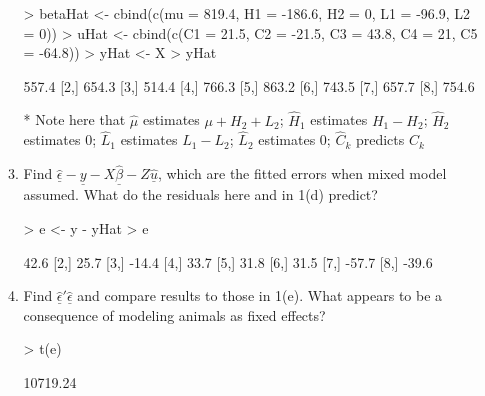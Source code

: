 \documentclass[12pt,a4paper]{paper}
\begin{document}
\begin{enumerate}
\begin{enumerate}
\begin{Schunk}
\begin{Sinput}
> betaHat <- cbind(c(mu = 819.4, H1 = -186.6, H2 = 0, L1 = -96.9, L2 = 0))
> uHat <- cbind(c(C1 = 21.5, C2 = -21.5, C3 = 43.8, C4 = 21,  C5 = -64.8))
> yHat <- X %*% betaHat + Z %*% uHat
> yHat
\end{Sinput}
\begin{Soutput}
      [,1]
[1,] 557.4
[2,] 654.3
[3,] 514.4
[4,] 766.3
[5,] 863.2
[6,] 743.5
[7,] 657.7
[8,] 754.6
\end{Soutput}
\end{Schunk}
\item[*] Note here that $\hat{\mu}$ estimates $\mu + H_{2} + L_{2}$; $\hat{H}_{1}$ estimates $H_{1} - H_{2}$; $\hat{H}_{2}$ estimates $0$; $\hat{L}_{1}$ estimates $L_{1} - L_{2}$; $\hat{L}_{2}$ estimates $0$; $\hat{C}_{k}$ predicts $C_{k}$
\item Find $\underline{\hat{\epsilon}} - \underline{y} - X\underline{\hat{\beta}} - Z\underline{\hat{u}}$, which are the fitted errors when mixed model assumed. What do the residuals here and in 1(d) predict?
\begin{Schunk}
\begin{Sinput}
> e <- y - yHat
> e
\end{Sinput}
\begin{Soutput}
      [,1]
[1,]  42.6
[2,]  25.7
[3,] -14.4
[4,]  33.7
[5,]  31.8
[6,]  31.5
[7,] -57.7
[8,] -39.6
\end{Soutput}
\end{Schunk}
\item Find $\underline{\hat{\epsilon}}'\underline{\hat{\epsilon}}$ and compare results to those in 1(e). What appears to be a consequence of modeling animals as fixed effects?
\begin{Schunk}
\begin{Sinput}
> t(e) %*% e
\end{Sinput}
\begin{Soutput}
         [,1]
[1,] 10719.24
\end{Soutput}
\end{Schunk}
\end{enumerate}
\end{enumerate}
\end{document}
